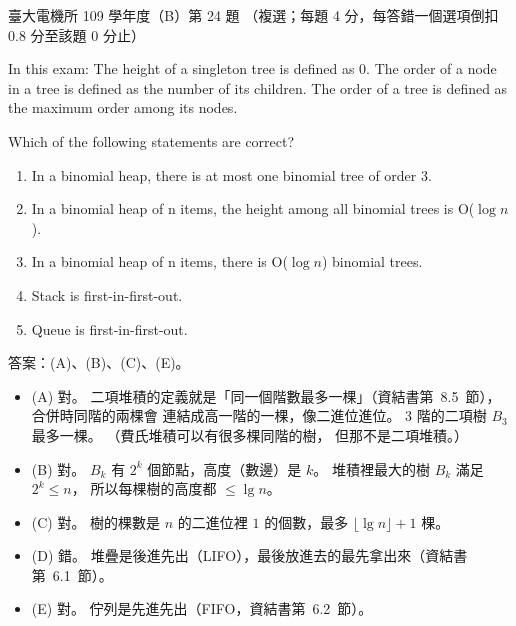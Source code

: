 \begin{pastexam}[label={px:ntu-109-ee-ds-24}]{臺大電機所 109 學年度（B）第 24 題}
（複選；每題 4 分，每答錯一個選項倒扣 0.8 分至該題 0 分止）

In this exam: The height of a singleton tree is defined as 0. The order of a node in a tree is
defined as the number of its children. The order of a tree is defined as the maximum order among
its nodes.

Which of the following statements are correct?
\begin{enumerate}[label=(\Alph*)]
\item In a binomial heap, there is at most one binomial tree of order 3.
\item In a binomial heap of n items, the height among all binomial trees is O($\log n$).
\item In a binomial heap of n items, there is O($\log n$) binomial trees.
\item Stack is first-in-first-out.
\item Queue is first-in-first-out.
\end{enumerate}
\end{pastexam}

\begin{pastsoln}
答案：(A)、(B)、(C)、(E)。

\begin{itemize}
\item (A) 對。 二項堆積的定義就是「同一個階數最多一棵」（資結書第~8.5~節），合併時同階的兩棵會
連結成高一階的一棵，像二進位進位。 3 階的二項樹 $B_3$ 最多一棵。 （費氏堆積可以有很多棵同階的樹，
但那不是二項堆積。）
\item (B) 對。 $B_k$ 有 $2^k$ 個節點，高度（數邊）是 $k$。 堆積裡最大的樹 $B_k$ 滿足 $2^k \le n$，
所以每棵樹的高度都 $\le \lg n$。
\item (C) 對。 樹的棵數是 $n$ 的二進位裡 $1$ 的個數，最多 $\lfloor \lg n \rfloor + 1$ 棵。
\item (D) 錯。 堆疊是後進先出（LIFO），最後放進去的最先拿出來（資結書第~6.1~節）。
\item (E) 對。 佇列是先進先出（FIFO，資結書第~6.2~節）。
\end{itemize}
\end{pastsoln}
